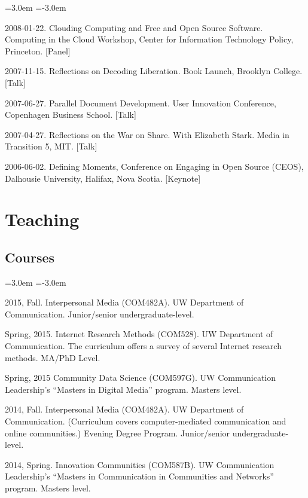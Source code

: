 \documentclass[10pt]{article}
\newenvironment{cvlist}{
\begin{list}{}{\leftmargin=3.0em \itemindent=-3.0em}
  \setlength{\itemsep}{0pt}
  \setlength{\parskip}{0em}
  \setlength{\parsep}{1em}
  \setlength{\parindent}{0em}}
{\vspace{1em}
\end{list}}
\begin{document}
\begin{cvlist}
\item 2008-01-22. Clouding Computing and Free and Open Source Software. Computing in the Cloud Workshop, Center for Information Technology Policy, Princeton. [Panel]
\item 2007-11-15. Reflections on Decoding Liberation. Book Launch, Brooklyn College. [Talk]
\item 2007-06-27. Parallel Document Development. User Innovation Conference, Copenhagen Business School. [Talk]
\item 2007-04-27. Reflections on the War on Share. With Elizabeth Stark. Media in Transition 5, MIT. [Talk]
\item 2006-06-02. Defining Moments, Conference on Engaging in Open Source (CEOS), Dalhousie University, Halifax, Nova Scotia. [Keynote]
\end{cvlist}

\section{Teaching}

\subsection{Courses}
\begin{cvlist}
\item 2015, Fall. Interpersonal Media (COM482A). UW Department of Communication. Junior/senior undergraduate-level.
\item Spring, 2015. Internet Research Methods (COM528). UW Department of Communication. The curriculum offers a survey of several Internet research methods. MA/PhD Level.
\item Spring, 2015 Community Data Science (COM597G). UW Communication Leadership's ``Masters in Digital Media'' program.  Masters level.
\item 2014, Fall. Interpersonal Media (COM482A). UW Department of Communication. (Curriculum covers computer-mediated communication and online communities.)  Evening Degree Program. Junior/senior undergraduate-level.
\item 2014, Spring. Innovation Communities (COM587B). UW Communication Leadership's ``Masters in Communication in Communities and Networks'' program. Masters level. 
\end{cvlist}
\end{document}
